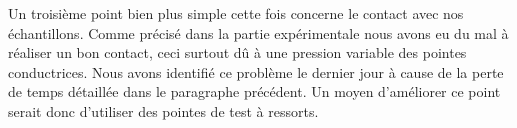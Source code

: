 \bigskip

Un troisième point bien plus simple cette fois concerne le contact avec nos échantillons. Comme précisé dans la partie expérimentale nous avons eu du mal à réaliser un bon contact, ceci surtout dû à une pression variable des pointes conductrices. Nous avons identifié ce problème le dernier jour à cause de la perte de temps détaillée dans le paragraphe précédent.  Un moyen d'améliorer ce point serait donc d'utiliser des pointes de test à ressorts.
